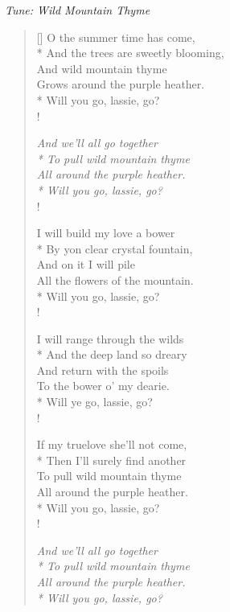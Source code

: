 \documentclass[MAIN]{subfiles}
\begin{document}
\bigskip

\begin{center}
{\it Tune: Wild Mountain Thyme}
\end{center}

\bigskip

\settowidth{\versewidth}{O the summer time has come,}
\begin{verse}[\versewidth]
O the summer time has come,\\*
\vin And the trees are sweetly blooming,\\
And wild mountain thyme\\
\vin Grows around the purple heather.\\*
\vin \vin Will you go, lassie, go?\\!

{\it And we'll all go together\\*
\vin To pull wild mountain thyme\\
All around the purple heather.\\*
\vin Will you go, lassie, go?}\\!

I will build my love a bower\\*
\vin By yon clear crystal fountain,\\
And on it I will pile\\
\vin All the flowers of the mountain.\\*
\vin \vin Will you go, lassie, go?\\!

I will range through the wilds\\*
\vin And the deep land so dreary\\
And return with the spoils\\
\vin To the bower o' my dearie.\\*
\vin \vin Will ye go, lassie, go?\\!

If my truelove she'll not come,\\*
\vin Then I'll surely find another\\
To pull wild mountain thyme\\
\vin All around the purple heather.\\*
\vin \vin Will you go, lassie, go?\\!

{\it And we'll all go together\\*
\vin To pull wild mountain thyme\\
All around the purple heather.\\*
\vin Will you go, lassie, go?}
\end{verse}
\end{document}

